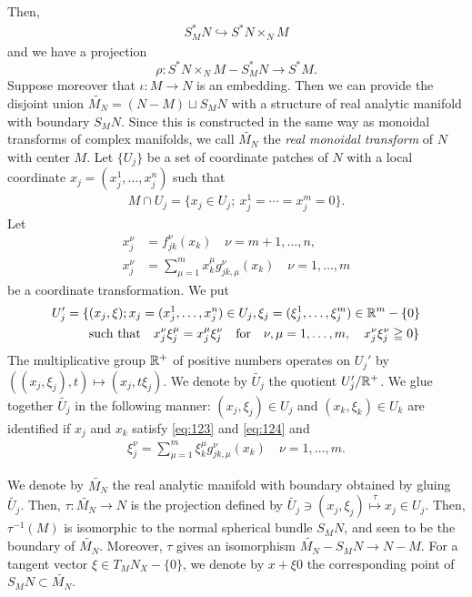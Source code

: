 Then,
\begin{align*}
    S^\ast_{M}N \hookrightarrow S^\ast N \times_{N} M
\end{align*}
and we have a projection
\begin{equation}
    \rho \colon S^\ast N \times_{N} M - S^\ast_{M}N \longrightarrow S^\ast M.
\end{equation}%
Suppose moreover that $\iota\colon M \to N$ is an embedding. 
Then we can provide the disjoint 
union $\widetilde{M_N} = (N - M)\sqcup S_{M}N$ with 
a structure of real analytic manifold with boundary $S_{M}N$.
Since this is constructed in the same way as monoidal transforms 
of complex manifolds, we call $\widetilde{M_N}$ the \emph{real monoidal 
transform} of $N$ with center $M$.
Let $\{U_j\}$ be a set of coordinate patches of $N$ with 
a local coordinate $x_j = (x_j^1, \ldots ,x_j^n)$ such that
\begin{align*}
    M\cap U_j = \{x_j\in U_j ;\ x_j^1 = \cdots =x_j^m=0\}.
\end{align*}
Let 
\begin{align}
    x_j^\nu &= f_{jk}^\nu(x_k) \quad\nu = m+1,\ldots,n,  \label{eq:123}\\
    x_j^\nu &= \sum_{\mu=1}^{m}x_k^\mu g_{jk,\mu}^\nu(x_k) \quad\nu = 1,\ldots,m \label{eq:124}
\end{align}%
be a coordinate transformation. We put
\begin{align*}
    U_j' = \{&(x_j,\xi); x_j = (x_j^1, \ldots ,x_j^n)\in U_j, \xi_j = (\xi_j^1, \ldots ,\xi_j^m) \in\mathbb{R}^m - \{0\}\\
    &\text{such that}\quad x_j^\nu\xi_j^\mu = x_j^\mu \xi_j^\nu \quad\text{for}\quad \nu,\mu = 1,\ldots,m, \quad x_j^\nu \xi_j^\nu \geqq 0\}
\end{align*}
The multiplicative group $\mathbb{R}^+$ of positive numbers 
operates on $U_j'$ by $((x_j, \xi_j), t)\mapsto (x_j,t\xi_j)$. 
We denote by $\widetilde{U_j}$ the quotient $U'_j/\mathbb{R}^+$. 
We glue together $\widetilde{U_j}$ in the following 
manner: $(x_j,\xi_j)\in U_j$ and $(x_k,\xi_k)\in U_k$ are 
identified if $x_j$ and $x_k$ satisfy \eqref{eq:123} and \eqref{eq:124} and
\begin{align*}
    {\xi}_j^{\nu} = \sum_{\mu=1}^{m}{\xi}_k^{\mu}g_{jk,\mu}^{\nu}(x_k)\quad {\nu} = 1,\ldots,m.
\end{align*}

We denote by $\widetilde{M_N}$ the real analytic manifold 
with boundary obtained by gluing $\widetilde{U_j}$.
Then, $\tau \colon \widetilde{M_N} \to N$ is the projection defined 
by $\widetilde{U_j}\ni (x_j,\xi_j)\overset{\tau}{\mapsto}x_j\in U_j$. 
Then, $\tau^{-1}(M)$ is isomorphic to the normal spherical 
bundle $S_{M}N$, and seen to be the boundary 
of $\widetilde{M_N}$. Moreover, $\tau$ gives 
an isomorphism $\widetilde{M_N}-S_{M}N \to N - M$. 
For a tangent vector $\xi \in T_{M}N_X - \{0\}$, 
we denote by $x+\xi0$ the corresponding point 
of $S_{M}N\subset \widetilde{M_N}$. 

